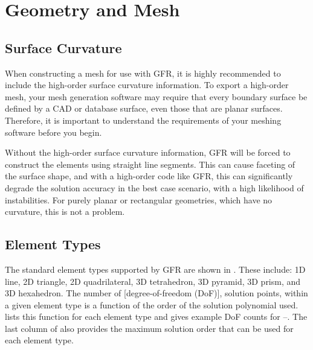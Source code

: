 \section{Geometry and Mesh}


\subsection{Surface Curvature}


When constructing a mesh for use with GFR, it is highly recommended to
include the high-order surface curvature information.
%
To export a high-order mesh, your mesh generation software may require
that every boundary surface be defined by a CAD or database surface, even those
that are planar surfaces.
%
Therefore, it is important to understand the requirements of your meshing
software before you begin.

Without the high-order surface curvature information, GFR will be forced
to construct the elements using straight line segments.
%
This can cause faceting of the surface shape, and
with a high-order code like GFR, this can significantly degrade the solution
accuracy in the best case scenario, with a high likelihood of instabilities.
%
For purely planar or rectangular geometries, which have no curvature,
this is not a problem.


\subsection{Element Types}
\label{SEC:Element_Types}


The standard element types supported by GFR are shown in
.
%
These include:
1D line,
2D triangle,
2D quadrilateral,
3D tetrahedron,
3D pyramid,
3D prism, and
3D hexahedron.
%
The number of [degree-of-freedom (DoF)],
\thatis solution points, within a given
element type is a function of the order \PO{} of the solution polynomial used.
%
 lists this function for each element type and gives
example DoF counts for \p[1]--\p[4].
%
The last column of  also provides the maximum solution
order that can be used for each element type.

